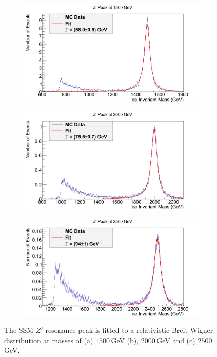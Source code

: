 \documentclass{article}
\begin{document}
\begin{figure}[htb]
    \begin{subfigure}{.5\textwidth}
        \raggedleft
        \includegraphics[width=\textwidth]{images/Z1500.png}
        \caption{}
        \label{fig:Z1500}
    \end{subfigure}
    \begin{subfigure}{.5\textwidth}
       	\raggedright
        \includegraphics[width=\textwidth]{images/Z2000.png}
        \caption{}
        \label{fig:Z2000}
    \end{subfigure}	
    \begin{subfigure}{.5\textwidth}
    	\centering
        \includegraphics[width=\textwidth]{images/Z2500.png}
        \caption{}
        \label{fig:Z2500}
    \end{subfigure}
    \caption{The SSM $Z'$ resonance peak is fitted to a relativistic Breit-Wigner distribution at masses of (a) $1500\,$GeV (b), $2000\,$GeV and (c) $2500\,$GeV. \label{fig:ZPrimePeaks}}
\end{figure}
\end{document}
